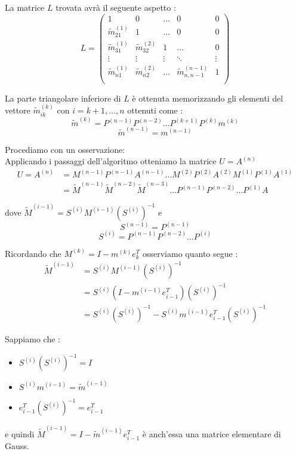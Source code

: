 \documentclass[12pt, a4paper]{book}
\theoremstyle{definition}
\begin{document}
\begin{flushleft}
La matrice $L$ trovata avrà il seguente aspetto : 
\[ 
	L = 
	\begin{pmatrix}
		1 & 0 & \dots & 0 &0 \\
		\widetilde{m}_{21}^{(1)} & 1 & \dots & 0 & 0 \\
	    \widetilde{m}_{31}^{(1)} & \widetilde{m}_{32}^{(2)} & 1 & \dots & 0  \\
		\vdots &  \vdots &  \vdots  & \ddots & \vdots  \\
		\widetilde{m}_{n1}^{(1)} & \widetilde{m}_{n2}^{(2)} & \dots & \widetilde{m}_{n,n-1}^{(n-1)} & 1 \\
	\end{pmatrix}
\]

La parte triangolare inferiore di $L$ è ottenuta memorizzando gli elementi del vettore $\widetilde{m}_{ik}^{(k)}$ con $i = k+1, \dots, n$ ottenuti come :
\[ 
	\widetilde{m}^{(k)} = P^{(n-1)}P^{(n-2)} \dots P^{(k+1)}P^{(k)}m^{(k)}
\]
\[ 
	\widetilde{m}^{(n-1)} =m^{(n-1)}
\]

Procediamo con un osservazione: \\
Applicando i passaggi dell'algoritmo otteniamo la matrice $U = A^{(n)}$ 
\[
	\begin{split}
		U = A^{(n)} &= M^{(n-1)}P^{(n-1)}A^{(n-1)} \dots M^{(2)}P^{(2)}A^{(2)}M^{(1)}P^{(1)}A^{(1)}\\
			&= \widetilde{M}^{(n-1)}\widetilde{M}^{(n-2)}\widetilde{M}^{(n-3)} \dots P^{(n-1)} P^{(n-2)} \dots  P^{(1)}A
	\end{split}
\]

dove $\widetilde{M}^{(i-1)} = S^{(i)}M^{(i-1)}(S^{(i)})^{-1}$ e 
\[ 
	S^{(n-1)} = P^{(n-1)}
\] 
\[ 
	S^{(i)} = P^{(n-1)}P^{(n-2)} \dots P^{(i)}
\] 

Ricordando che  $M^{(k)} = I - m^{(k)}e^{T}_{k}$ osserviamo quanto segue : 
\[ 	
	\begin{split}
		\widetilde{M}^{(i-1)} &= S^{(i)}M^{(i-1)}(S^{(i)})^{-1} \\
									    &= S^{(i)}(I - m^{(i-1)}e^{T}_{i-1})(S^{(i)})^{-1} \\
									    &= S^{(i)}(S^{(i)})^{-1} - S^{(i)} m^{(i-1)}e^{T}_{i-1}(S^{(i)})^{-1} 
	\end{split}
\]

Sappiamo che :
\begin{itemize}
	\item $ S^{(i)}(S^{(i)})^{-1} = I$
	\item $S^{(i)} m^{(i-1)} = \widetilde{m}^{(i-1)}$
	\item $e^{T}_{i-1}(S^{(i)})^{-1} = e^{T}_{i-1}$
\end{itemize}

e quindi $\widetilde{M}^{(i-1)} = I -  \widetilde{m}^{(i-1)} e^{T}_{i-1}$ è anch'essa una matrice elementare di Gauss.
\end{flushleft}
\end{document}
